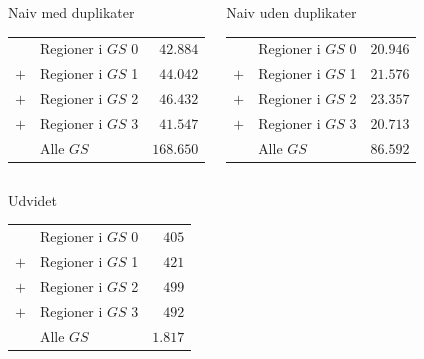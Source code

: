 \documentclass[xcolor=table]{beamer}
\begin{document}
\begin{frame}
{    
    \begin{columns}[c]
        \begin{exampleblock}{Naiv \alert{med duplikater}}
            \begin{tabular}{r@{\ \ }p{7em}r}
                    & Regioner i $GS$ 0             &  $42.884$ \\
                $+$ & Regioner i $GS$ 1             &  $44.042$ \\
                $+$ & Regioner i \alert{$GS$ 2}             &  \alert{$46.432$} \\
                $+$ & Regioner i $GS$ 3             &  $41.547$ \\\hline
                & Alle $GS$       & $168.650$
            \end{tabular}
        \end{exampleblock}
        \begin{exampleblock}{Naiv uden duplikater}
            \begin{tabular}{r@{\ \ }p{7em}r}
                    & Regioner i $GS$ 0             &  $20.946$ \\
                $+$ & Regioner i $GS$ 1             &  $21.576$ \\
                $+$ & Regioner i \alert{$GS$ 2}             &  \alert{$23.357$} \\
                $+$ & Regioner i $GS$ 3             &  $20.713$ \\\hline
                & Alle $GS$       & $86.592$
            \end{tabular}
        \end{exampleblock}
    \end{columns}
    \begin{exampleblock}{Udvidet}
        \centering
        \begin{tabular}{r@{\ \ }p{12em}r}
                & Regioner i $GS$ 0         &  $405$ \\
            $+$ & Regioner i $GS$ 1         &  $421$ \\
            $+$ & Regioner i \alert{$GS$ 2}         &  \alert{$499$} \\
            $+$ & Regioner i $GS$ 3         &  $492$ \\\hline
            & Alle $GS$   & $1.817$
        \end{tabular}
    \end{exampleblock}
    }


\end{frame}
\end{document}
